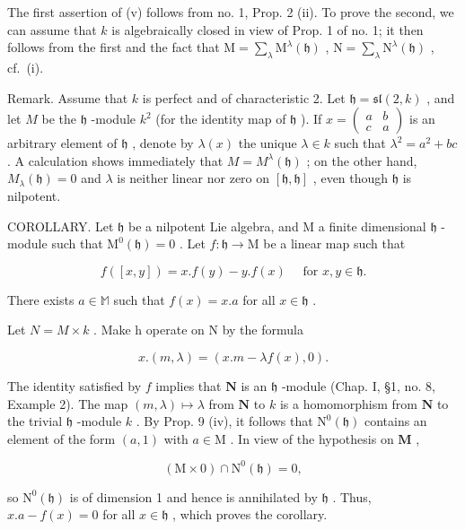 The first assertion of (v) follows from no. 1, Prop. 2 (ii). To prove the second, we can assume that \(k\) is algebraically closed in view of Prop. 1 of no. 1; it then follows from the first and the fact that \(\mathrm{M} = \sum_{\lambda} \mathrm{M}^{\lambda}(\mathfrak{h})\) , \(\mathrm{N} = \sum_{\lambda} \mathrm{N}^{\lambda}(\mathfrak{h})\) , cf.~(i).

Remark. Assume that \(k\) is perfect and of characteristic 2. Let \(\mathfrak{h} = \mathfrak{sl}(2, k)\) , and let \(M\) be the \(\mathfrak{h}\) -module \(k^2\) (for the identity map of \(\mathfrak{h}\) ). If \(x = \begin{pmatrix} a & b \\ c & a \end{pmatrix}\) is an arbitrary element of \(\mathfrak{h}\) , denote by \(\lambda(x)\) the unique \(\lambda \in k\) such that \(\lambda^2 = a^2 + bc\) . A calculation shows immediately that \(M = M^\lambda(\mathfrak{h})\) ; on the other hand, \(M_\lambda(\mathfrak{h}) = 0\) and \(\lambda\) is neither linear nor zero on \([\mathfrak{h}, \mathfrak{h}]\) , even though \(\mathfrak{h}\) is nilpotent.

COROLLARY. Let \(\mathfrak{h}\) be a nilpotent Lie algebra, and M a finite dimensional \(\mathfrak{h}\) -module such that \(\mathrm{M}^0 (\mathfrak{h}) = 0\) . Let \(f:\mathfrak{h}\to \mathrm{M}\) be a linear map such that

\[
f ([ x, y ]) = x. f (y) - y. f (x) \quad \text { for } x, y \in \mathfrak {h}.
\]

There exists \(a \in \mathbb{M}\) such that \(f(x) = x.a\) for all \(x \in \mathfrak{h}\) .

Let \(N = M \times k\) . Make h operate on N by the formula

\[
x. (m, \lambda) = (x. m - \lambda f (x), 0).
\]

The identity satisfied by \(f\) implies that \(\mathbf{N}\) is an \(\mathfrak{h}\) -module (Chap. I, §1, no. 8, Example 2). The map \((m, \lambda) \mapsto \lambda\) from \(\mathbf{N}\) to \(k\) is a homomorphism from \(\mathbf{N}\) to the trivial \(\mathfrak{h}\) -module \(k\) . By Prop. 9 (iv), it follows that \(\mathrm{N}^0(\mathfrak{h})\) contains an element of the form \((a, 1)\) with \(a \in \mathrm{M}\) . In view of the hypothesis on \(\mathbf{M}\) ,

\[
(\mathrm{M} \times 0) \cap \mathrm{N} ^ {0} (\mathfrak {h}) = 0,
\]

so \(\mathrm{N}^0 (\mathfrak{h})\) is of dimension 1 and hence is annihilated by \(\mathfrak{h}\) . Thus, \(x.a - f(x) = 0\) for all \(x\in \mathfrak{h}\) , which proves the corollary.

